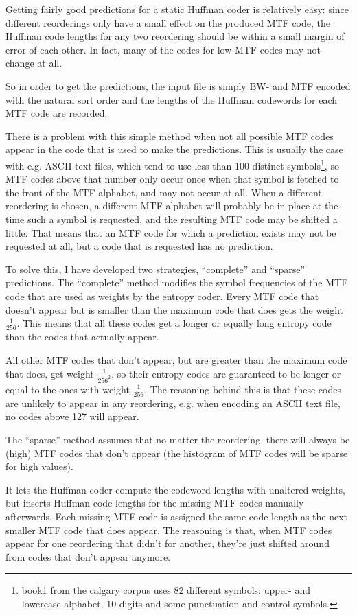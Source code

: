 \documentclass[a4paper]{scrreprt}
\begin{document}
Getting fairly good predictions for a static Huffman coder is relatively easy:
since different reorderings only have a small effect on the produced MTF code,
the Huffman code lengths for any two reordering should be within a small margin
of error of each other. In fact, many of the codes for low MTF codes may not
change at all.

So in order to get the predictions, the input file is simply BW- and MTF encoded
with the natural sort order and the lengths of the Huffman codewords for each
MTF code are recorded.

There is a problem with this simple method when not all possible MTF codes
appear in the code that is used to make the predictions. This is usually the
case with e.g. ASCII text files, which tend to use less than 100 distinct
symbols\footnote{book1 from the calgary corpus uses 82 different symbols:
upper- and lowercase alphabet, 10 digits and some punctuation and control
symbols.}, so MTF codes above that number only occur once when that symbol is
fetched to the front of the MTF alphabet, and may not occur at all.
When a different reordering is chosen, a different MTF alphabet will probably be
in place at the time such a symbol is requested, and the resulting MTF code may
be shifted a little. That means that an MTF code for which a prediction exists
may not be requested at all, but a code that is requested has no prediction.

To solve this, I have developed two strategies, ``complete'' and ``sparse''
predictions.
The ``complete'' method modifies the symbol frequencies of the MTF code that are
used as weights by the entropy coder. Every MTF code that doesn't appear but is
smaller than the maximum code that does gets the weight \(\frac{1}{256}\). This
means that all these codes get a longer or equally long entropy code than the
codes that actually appear.

All other MTF codes that don't appear, but are greater than the maximum code
that does, get weight \(\frac{1}{256^2}\), so their entropy codes are guaranteed
to be longer or equal to the ones with weight \(\frac{1}{256}\). The reasoning
behind this is that these codes are unlikely to appear in any reordering, e.g.
when encoding an ASCII text file, no codes above 127 will appear.

The ``sparse'' method assumes that no matter the reordering, there will always
be (high) MTF codes that don't appear (the histogram of MTF codes will be
sparse for high values).

It lets the Huffman coder compute the codeword lengths with unaltered weights,
but inserts Huffman code lengths for the missing MTF codes manually afterwards.
Each missing MTF code is assigned the same code length as the next smaller MTF
code that does appear. The reasoning is that, when MTF codes appear for one
reordering that didn't for another, they're just shifted around from codes that
don't appear anymore.
\end{document}
